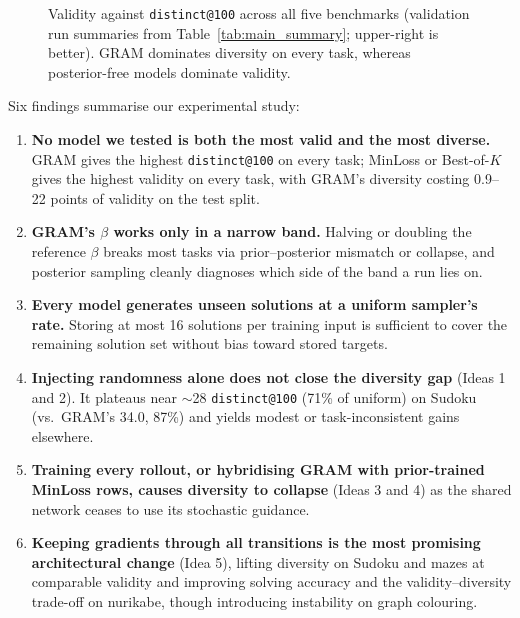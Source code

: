 \documentclass[11pt]{article}
\newcommand{\bok}{best-of-$K$}
\newcommand{\Bok}{Best-of-$K$}
\begin{document}
\begin{figure}[!ht]
  \caption{Validity against \texttt{distinct@100} across all five benchmarks (validation run summaries from Table~\ref{tab:main_summary}; upper-right is better). GRAM dominates diversity on every task, whereas posterior-free models dominate validity.}
  \label{fig:main_frontier}
\end{figure}

Six findings summarise our experimental study:
\begin{enumerate}
  \item \textbf{No model we tested is both the most valid and the most diverse.} GRAM gives the highest \texttt{distinct@100} on every task; MinLoss or \Bok{} gives the highest validity on every task, with GRAM's diversity costing 0.9--22 points of validity on the test split.
  \item \textbf{GRAM's $\beta$ works only in a narrow band.} Halving or doubling the reference $\beta$ breaks most tasks via prior--posterior mismatch or collapse, and posterior sampling cleanly diagnoses which side of the band a run lies on.
  \item \textbf{Every model generates unseen solutions at a uniform sampler's rate.} Storing at most 16 solutions per training input is sufficient to cover the remaining solution set without bias toward stored targets.
  \item \textbf{Injecting randomness alone does not close the diversity gap} (Ideas 1 and 2). It plateaus near $\sim$28 \texttt{distinct@100} (71\% of uniform) on Sudoku (vs.\ GRAM's 34.0, 87\%) and yields modest or task-inconsistent gains elsewhere.
  \item \textbf{Training every rollout, or hybridising GRAM with prior-trained MinLoss rows, causes diversity to collapse} (Ideas 3 and 4) as the shared network ceases to use its stochastic guidance.
  \item \textbf{Keeping gradients through all transitions is the most promising architectural change} (Idea 5), lifting diversity on Sudoku and mazes at comparable validity and improving solving accuracy and the validity--diversity trade-off on nurikabe, though introducing instability on graph colouring.
\end{enumerate}
\end{document}
